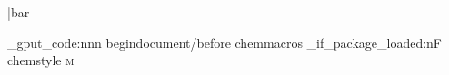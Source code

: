 
\RequirePackage{siunitx}

\DeclareSIUnit \angstrom         {\SIUnitSymbolAngstrom}
\DeclareSIUnit {}
\DeclareSIUnit {}
\DeclareSIUnit {}
\DeclareSIUnit \bar              {bar}
\DeclareSIUnit {}
\DeclareSIUnit {}
\DeclareSIUnit {}
\DeclareSIUnit {}
\DeclareSIUnit \moLar            {\mole\per\liter}
\DeclareSIUnit \MolMass          {\gram\per\mole}
\DeclareSIUnit {}
\DeclareSIUnit {}

\hook_gput_code:nnn {begindocument/before} {chemmacros}
  {
    \chemmacros_if_package_loaded:nF {chemstyle}
      {
        \DeclareSIUnit {\cmc  } {\cubic\centi\metre}
        \DeclareSIUnit {\molar} {\mole\per\cubic\deci\metre}
        \DeclareSIUnit {\Molar} {\textsc{m}}
      }
  }

\ChemModuleEnd
